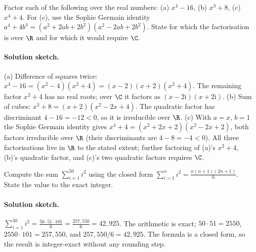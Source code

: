 \begin{exercise}
Factor each of the following over the real numbers: (a) $x^{4} - 16$,
(b) $x^{3} + 8$, (c) $x^{4} + 4$. For (c), use the Sophie Germain
identity $a^{4} + 4b^{4} = (a^{2} + 2ab + 2b^{2})(a^{2} - 2ab +
2b^{2})$. State for which the factorisation is over $\R$ and for
which it would require $\C$.

\paragraph{Solution sketch.}
(a) Difference of squares twice: $x^{4} - 16 = (x^{2} - 4)(x^{2} + 4)
= (x - 2)(x + 2)(x^{2} + 4)$. The remaining factor $x^{2} + 4$ has
no real roots; over $\C$ it factors as $(x - 2\mathrm{i})(x + 2\mathrm{i})$.
(b) Sum of cubes: $x^{3} + 8 = (x + 2)(x^{2} - 2x + 4)$. The
quadratic factor has discriminant $4 - 16 = -12 < 0$, so it is
irreducible over $\R$. (c) With $a = x$, $b = 1$ the Sophie Germain
identity gives $x^{4} + 4 = (x^{2} + 2x + 2)(x^{2} - 2x + 2)$, both
factors irreducible over $\R$ (their discriminants are $4 - 8 = -4
< 0$). All three factorisations live in $\R$ to the stated extent;
further factoring of (a)'s $x^{2} + 4$, (b)'s quadratic factor, and
(c)'s two quadratic factors requires $\C$.
\end{exercise}

\begin{exercise}
Compute the sum $\sum_{i=1}^{50} i^{2}$ using the closed form
$\sum_{i=1}^{n} i^{2} = \frac{n(n+1)(2n+1)}{6}$. State the value to
the exact integer.

\paragraph{Solution sketch.}
$\sum_{i=1}^{50} i^{2} = \frac{50 \cdot 51 \cdot 101}{6} =
\frac{257{,}550}{6} = 42{,}925$. The arithmetic is exact;
$50 \cdot 51 = 2550$, $2550 \cdot 101 = 257{,}550$, and
$257{,}550 / 6 = 42{,}925$. The formula is a closed form, so the
result is integer-exact without any rounding step.
\end{exercise}

